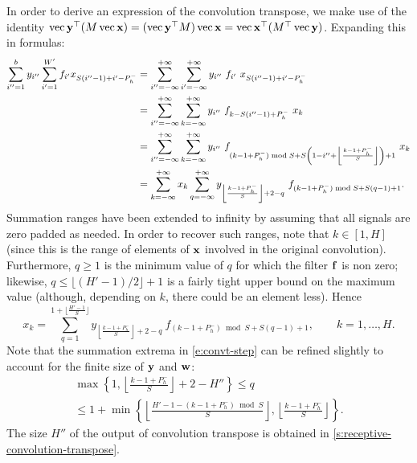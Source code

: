 In order to derive an expression of the convolution transpose,  we make use of the identity $\operatorname{vec} \mathbf{y}^\top (M \operatorname{vec} \mathbf{x}) = (\operatorname{vec} \mathbf{y}^\top M) \operatorname{vec}\mathbf{x} = \operatorname{vec}\mathbf{x}^\top (M^\top \operatorname{vec}\mathbf{y})$. Expanding this in formulas:
\begin{align*}
\sum_{i''=1}^b y_{i''} 
\sum_{i'=1}^{W'} f_{i'} x_{S (i''-1) + i'  -P_h^-}
&=
\sum_{i''=-\infty}^{+\infty}
\sum_{i'=-\infty}^{+\infty} 
y_{i''}\ f_{i'}\ x_{S (i''-1) + i'  -P_h^-}
\\
&=
\sum_{i''=-\infty}^{+\infty}
\sum_{k=-\infty}^{+\infty} 
y_{i''}\ f_{k-S(i'' -1) + P_h^-}\ x_{k}
\\
&=
\sum_{i''=-\infty}^{+\infty}
\sum_{k=-\infty}^{+\infty} 
y_{i''}%
\ %
f_{%
(k-1+ P_h^-) \bmod S +
S \left(1 -i''  + \left\lfloor \frac{k-1+ P_h^-}{S} \right\rfloor\right)+1
}\ x_{k}
\\
&=
\sum_{k=-\infty}^{+\infty} 
x_{k}
\sum_{q=-\infty}^{+\infty}
y_{\left\lfloor \frac{k-1+ P_h^-}{S} \right\rfloor + 2 - q}
\ %
f_{(k-1+ P_h^-)\bmod S +S(q - 1)+1}.
\end{align*}
Summation ranges have been extended to infinity by assuming that all signals are zero padded as needed. In order to recover such ranges, note that $k \in [1,H]$ (since this is the range of elements of $\mathbf{x}$ involved in the original convolution). Furthermore, $q\geq 1$ is the minimum value of $q$ for which the filter $\mathbf{f}$ is non zero; likewise, $q\leq \lfloor (H'-1)/2\rfloor +1$ is a fairly tight upper bound on the maximum value (although, depending on $k$, there could be an element less). Hence
\begin{equation}\label{e:convt-step}
 x_k = 
 \sum_{q=1}^{1 + \lfloor \frac{H'-1}{S} \rfloor}
y_{\left\lfloor \frac{k-1+ P_h^-}{S} \right\rfloor + 2 - q}\ %
f_{(k-1+ P_h^-)\bmod S +S(q - 1)+1},
\qquad k=1,\dots, H.
\end{equation}
Note that the summation extrema in \eqref{e:convt-step} can be refined slightly to account for the finite size of $\mathbf{y}$ and $\mathbf{w}$:
\begin{multline*}
\max\left\{
1, 
\left\lfloor \frac{k-1 + P_h^-}{S} \right\rfloor + 2 - H''
\right\}
\leq q \\
\leq
1 +\min\left\{
\left\lfloor \frac{H'-1-(k-1+ P_h^-)\bmod S}{S} \right\rfloor, 
\left\lfloor \frac{k-1 + P_h^-}{S} \right\rfloor
\right\}.
\end{multline*}
The size $H''$ of the output of convolution transpose is obtained in \cref{s:receptive-convolution-transpose}.


